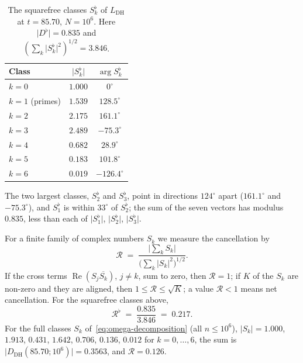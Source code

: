 \documentclass[11pt]{amsart}
\theoremstyle{definition}
\theoremstyle{remark}
\renewcommand{\DH}{\mathrm{DH}}
\newcommand{\abs}[1]{\lvert #1 \rvert}
\newcommand{\re}{\operatorname{Re}}
\newcommand{\calR}{\mathcal{R}}
\begin{document}
\begin{table}[ht]
\centering
\caption{The squarefree classes $S_k^\flat$ of $L_{\DH}$ at $t = 85.70$,
  $N = 10^6$.  Here $\abs{D^\flat}=0.835$ and
  $(\sum_k\abs{S_k^\flat}^2)^{1/2}=3.846$.}
\label{tab:interference}
\begin{tabular}{@{}lcc@{}}
\toprule
Class & $\abs{S_k^\flat}$ & $\arg S_k^\flat$ \\
\midrule
$k = 0$            & $1.000$ & $0^\circ$ \\
$k = 1$ (primes)   & $1.539$ & $128.5^\circ$ \\
$k = 2$            & $2.175$ & $161.1^\circ$ \\
$k = 3$            & $2.489$ & $-75.3^\circ$ \\
$k = 4$            & $0.682$ & $28.9^\circ$ \\
$k = 5$            & $0.183$ & $101.8^\circ$ \\
$k = 6$            & $0.019$ & $-126.4^\circ$ \\
\bottomrule
\end{tabular}
\end{table}

The two largest classes, $S_2^\flat$ and $S_3^\flat$, point in directions
$124^\circ$ apart ($161.1^\circ$ and $-75.3^\circ$), and $S_1^\flat$ is
within $33^\circ$ of $S_2^\flat$; the sum of the seven vectors has modulus
$0.835$, less than each of $\abs{S_1^\flat}$, $\abs{S_2^\flat}$,
$\abs{S_3^\flat}$.

For a finite family of complex numbers $S_k$ we measure the cancellation
by
\begin{equation}\label{eq:cancellation}
  \calR \;=\;
  \frac{\bigl\lvert \sum_k S_k \bigr\rvert}
       {\bigl(\sum_k \abs{S_k}^2\bigr)^{1/2}}.
\end{equation}
If the cross terms $\re(S_j\overline{S_k})$, $j\ne k$, sum to zero, then
$\calR=1$; if $K$ of the $S_k$ are non-zero and they are aligned, then $1\le\calR\le\sqrt K$; a value $\calR<1$ means net
cancellation.  For the squarefree classes above,
\begin{equation}\label{eq:calR-value}
  \calR^\flat \;=\; \frac{0.835}{3.846}\;=\; 0.217 .
\end{equation}
For the full classes $S_k$ of~\eqref{eq:omega-decomposition} (all
$n\le10^6$), $\abs{S_k}=1.000$, $1.913$, $0.431$, $1.642$, $0.706$,
$0.136$, $0.012$ for $k=0,\dots,6$, the sum is
$\abs{D_{\DH}(85.70;10^6)}=0.3563$, and $\calR=0.126$.
\end{document}
